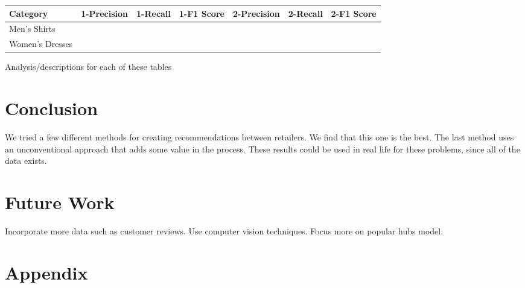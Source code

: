 \documentclass[11pt]{article}
\begin{document}
\begin{center}
\begin{tabular}{ | l | c | c | c | c | c | c |}
\hline
Category & 1-Precision & 1-Recall & 1-F1 Score & 2-Precision & 2-Recall & 2-F1 Score \\ \hline\hline
Men's Shirts &&&&&&\\ \hline
Women's Dresses &&&&&&\\ \hline
\end{tabular}
\end{center}

Analysis/descriptions for each of these tables

\section*{Conclusion}
We tried a few different methods for creating recommendations between
retailers. We find that this one is the best.
The last method uses an unconventional approach that adds some value in the
process. These results could be used in real life for these problems, since all
of the data exists.

\section*{Future Work}
Incorporate more data such as customer reviews. Use computer vision techniques.
Focus more on popular hubs model.

\section*{Appendix}

\begin{thebibliography}{9}

\end{thebibliography}
\end{document}
